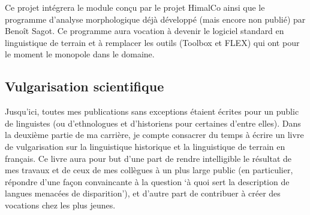 \documentclass[oldfontcommands,oneside,a4paper,11pt]{article}
\begin{document}
Ce projet intégrera le module conçu par le projet HimalCo ainsi que le programme d'analyse morphologique déjà développé (mais encore non publié) par Benoît Sagot. Ce programme aura vocation à devenir le logiciel standard en linguistique de terrain et à remplacer les outils (Toolbox et FLEX) qui ont pour le moment le monopole dans le domaine.


\subsection{Vulgarisation scientifique}
Jusqu'ici, toutes mes publications sans exceptions étaient écrites pour un public de linguistes (ou d'ethnologues et d'historiens pour certaines d'entre elles). Dans la deuxième partie de ma carrière, je compte consacrer du temps à écrire un livre de vulgarisation sur la linguistique historique et la linguistique de terrain en français. Ce livre aura pour but d'une part de rendre intelligible le résultat de mes travaux et de ceux de mes collègues à un plus large public (en particulier, répondre d'une façon convaincante à la question `à quoi sert la description de langues menacées de disparition'), et d'autre part de contribuer à créer des vocations chez les plus jeunes.

 


 
\end{document}
